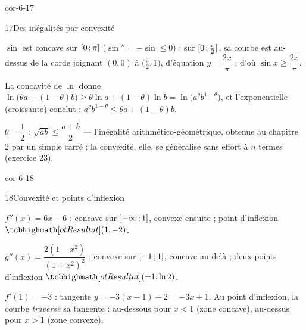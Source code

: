 \begin{blocLivre}{cor-6-17}
\begin{corrige}{17}{Des inégalités par convexité}
\begin{questions}
  \item $\sin$ est concave sur $\mathopen{[}0\,{;}\,\pi\mathclose{]}$ ($\sin''=-\sin\leq0$) :
    sur $\mathopen{[}0\,{;}\,\frac{\pi}{2}\mathclose{]}$, sa courbe est au-dessus de la corde
    joignant $(0,0)$ à $\bigl(\frac{\pi}{2},1\bigr)$, d'équation
    $y=\dfrac{2x}{\pi}$ : d'où $\sin x\geq\dfrac{2x}{\pi}$.
  \item La concavité de $\ln$ donne
    $\ln\bigl(\theta a+(1-\theta)b\bigr)\geq\theta\ln a+(1-\theta)\ln b
    =\ln\bigl(a^{\theta}b^{1-\theta}\bigr)$, et l'exponentielle (croissante)
    conclut : $a^{\theta}b^{1-\theta}\leq\theta a+(1-\theta)b$.
  \item $\theta=\dfrac12$ : $\sqrt{ab}\leq\dfrac{a+b}{2}$ — l'inégalité
    arithmético-géométrique, obtenue au chapitre 2 par un simple carré ;
    la convexité, elle, se généralise sans effort à $n$ termes
    (exercice 23).
\end{questions}
\end{corrige}
\end{blocLivre}

\begin{blocLivre}{cor-6-18}
\begin{corrige}{18}{Convexité et points d'inflexion}
\begin{questions}
  \item $f''(x)=6x-6$ : concave sur $\mathopen{]}-\infty\,{;}\,1\mathclose{]}$, convexe ensuite ;
    point d'inflexion $\res{(1,-2)}$.
  \item $g''(x)=\dfrac{2(1-x^{2})}{(1+x^{2})^{2}}$ : convexe sur
    $\mathopen{[}-1\,{;}\,1\mathclose{]}$, concave au-delà ; deux points d'inflexion
    $\res{(\pm1,\ln2)}$.
  \item $f'(1)=-3$ : tangente $y=-3(x-1)-2=-3x+1$. Au point d'inflexion,
    la courbe \emph{traverse} sa tangente : au-dessous pour $x<1$ (zone
    concave), au-dessus pour $x>1$ (zone convexe).
\end{questions}
\end{corrige}
\end{blocLivre}

